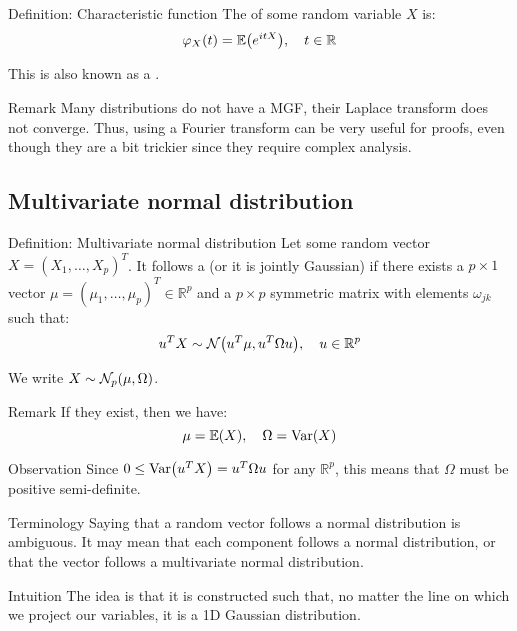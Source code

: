 \documentclass[a4paper]{article}
\begin{document}
\begin{parag}{Definition: Characteristic function}
    The  of some random variable $X$ is: 
    \[\phi_X\left(t\right) = \exval\left(e^{i t X}\right), \mathspace t \in \mathbb{R}\]

    This is also known as a .

    \begin{subparag}{Remark}
        Many distributions do not have a MGF, their Laplace transform does not converge. Thus, using a Fourier transform can be very useful for proofs, even though they are a bit trickier since they require complex analysis.
    \end{subparag}
\end{parag}

\subsection{Multivariate normal distribution}
\begin{parag}{Definition: Multivariate normal distribution}
    Let some random vector $X = \left(X_1, \ldots, X_p\right)^T$. It follows a  (or it is jointly Gaussian) if there exists a $p \times 1$ vector $\mu = \left(\mu_1, \ldots, \mu_p\right)^T \in \mathbb{R}^p$ and a $p \times p$ symmetric matrix with elements $\omega_{jk}$ such that: 
    \[u^T X \followsdistr \mathcal{N}\left(u^T \mu, u^T \Omega u\right), \mathspace u \in \mathbb{R}^p\]
    
    We write $X \followsdistr \mathcal{N}_p\left(\mu, \Omega\right)$.

    \begin{subparag}{Remark}
        If they exist, then we have:
        \[\mu = \exval\left(X\right), \mathspace \Omega = \Var\left(X\right)\]
    \end{subparag}

    \begin{subparag}{Observation}
        Since $0 \leq \Var\left(u^T X\right) = u^T \Omega u$ for any $\mathbb{R}^p$, this means that $\Omega$ must be positive semi-definite.
    \end{subparag}
    
    \begin{subparag}{Terminology}
        Saying that a random vector follows a normal distribution is ambiguous. It may mean that each component follows a normal distribution, or that the vector follows a multivariate normal distribution.
    \end{subparag}

    \begin{subparag}{Intuition}
        The idea is that it is constructed such that, no matter the line on which we project our variables, it is a 1D Gaussian distribution.
    \end{subparag}
    
\end{parag}
\end{document}
